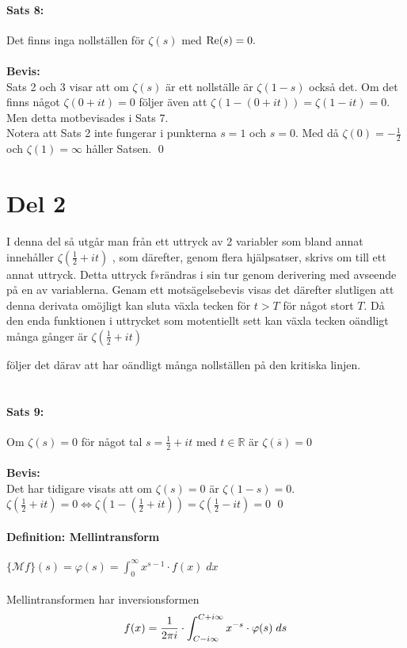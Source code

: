 \documentclass[a4paper,twoside]{article}%
\begin{document}
\paragraph{Sats 8:} Det finns inga nollställen för $\zeta(s)$ med $\operatorname{Re}(s) = 0.$\\
\\
{\bf Bevis:}\\
Sats 2 och 3 visar att om $\zeta(s)$ är ett nollställe är $\zeta(1 - s)$ också det.
Om det finns något $\zeta(0 + it) = 0$ följer även att $\zeta(1 - (0 + it)) = \zeta(1 - it) = 0$. Men detta 
motbevisades i Sats 7.\\
Notera att Sats 2 inte fungerar i punkterna $s = 1$ och $s = 0$. Med då $\zeta(0) = -\frac 1 2$ och 
$\zeta(1) = \infty$ håller Satsen.
\hfill \qed
\pagebreak
\newcommand{\zit}{
	$\zeta(\frac 1 2 + it)$
}
\section*{Del 2}
I denna del så utgår man från ett uttryck av 2 variabler som bland annat innehåller \zit, som
därefter, genom flera hjälpsatser, skrivs om till ett annat uttryck. Detta uttryck f»rändras i sin tur
genom derivering med avseende på en av variablerna. Genam ett motsägelsebevis visas det därefter
slutligen att denna derivata omöjligt kan sluta växla tecken för $t > T$ för något stort $T$. Då den enda
funktionen i uttrycket som motentiellt sett kan växla tecken oändligt många gånger är \zit 
följer det därav att \zfn har oändligt många nollställen på den kritiska linjen.\\
\\
\paragraph{Sats 9:} Om $\zeta(s) = 0$ för något tal $s = \frac 1 2 + it$ med $t \in \mathbb{R}$ är $\zeta(\overline{s}) = 0$ \\
\\
{\bf Bevis:}\\
Det har tidigare visats att om $\zeta(s) = 0$ är $\zeta(1 - s) = 0$. $\zeta(\frac 1 2 + it) = 0 \Leftrightarrow 
\zeta(1 - (\frac 1 2 + it)) = \zeta(\frac 1 2 - it) = 0$
\hfill \qed

\paragraph{Definition: Mellintransform} $\{\mathcal{M}f\}(s) = \varphi(s) = \int_0^\infty x^{s - 1} \cdot f(x) \; dx $ \\
\\
Mellintransformen har inversionsformen
\[
	f(x) = \frac {1} {2 \pi i} \cdot \int_{C - i \infty}^{C + i \infty}
		x^{-s} \cdot \varphi(s) \; ds
 \]
\end{document}
